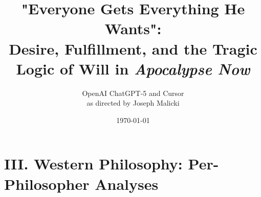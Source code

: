 \documentclass[12pt]{article}
\title{"Everyone Gets Everything He Wants":\\
  Desire, Fulfillment, and the Tragic Logic of Will in \textit{Apocalypse Now}}
\author{OpenAI ChatGPT-5 and Cursor\\
  as directed by Joseph Malicki}
\date{\today}
\begin{document}
\maketitle


\newpage

\newpage

\section*{III. Western Philosophy: Per-Philosopher Analyses}

\newpage

\newpage

\newpage

\newpage

\newpage

\newpage

\newpage

\newpage

\newpage

\newpage

\newpage


\newpage

\newpage

\newpage


\printbibliography
\end{document}
